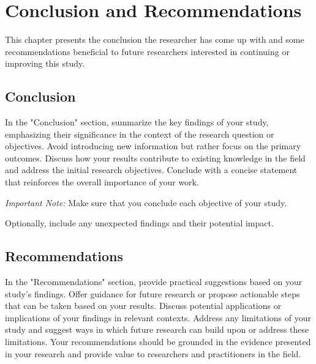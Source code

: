 
\renewcommand{\thechapter}{\Roman{chapter}}
\chapter{Conclusion and Recommendations}
    \thispagestyle{empty} 
    \renewcommand{\thechapter}{\arabic{chapter}}

    This chapter presents the conclusion the researcher has come up with and some recommendations beneficial to future researchers interested in continuing or improving this study.


\section{Conclusion}
    In the "Conclusion" section, summarize the key findings of your study, emphasizing their significance in the context of the research question or objectives. Avoid introducing new information but rather focus on the primary outcomes. Discuss how your results contribute to existing knowledge in the field and address the initial research objectives. Conclude with a concise statement that reinforces the overall importance of your work.

    \textit{Important Note:} Make sure that you conclude each objective of your study.

    Optionally, include any unexpected findings and their potential impact.

\section{Recommendations}
    In the "Recommendations" section, provide practical suggestions based on your study's findings. Offer guidance for future research or propose actionable steps that can be taken based on your results. Discuss potential applications or implications of your findings in relevant contexts. Address any limitations of your study and suggest ways in which future research can build upon or address these limitations. Your recommendations should be grounded in the evidence presented in your research and provide value to researchers and practitioners in the field.
